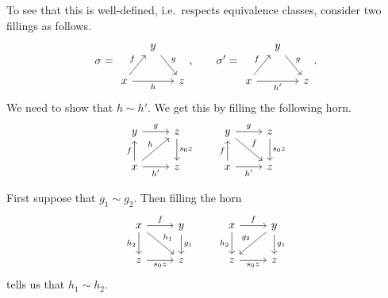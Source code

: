 \documentclass[main.tex]{subfiles}
\begin{document}
\begin{definition}
\begin{itemize}
      To see that this is well-defined, i.e.\ respects equivalence classes, consider two fillings as follows.
      \begin{equation*}
        \sigma =
        \begin{tikzcd}[column sep=small]
          & y
          \arrow[dr, "g"]
          \\
          x
          \arrow[rr, swap, "h"]
          \arrow[ur, "f"]
          && z
        \end{tikzcd}
        ,\qquad \sigma' =
        \begin{tikzcd}[column sep=small]
          & y
          \arrow[dr, "g"]
          \\
          x
          \arrow[rr, swap, "h'"]
          \arrow[ur, "f"]
          && z
        \end{tikzcd}.
      \end{equation*}
      We need to show that $h \sim h'$. We get this by filling the following horn.
      \begin{equation*}
        \begin{tikzcd}
          y
          \arrow[r, "g"]
          & z
          \arrow[d, "s_{0}z"]
          \\
          x
          \arrow[u, "f"]
          \arrow[ur, "h"]
          \arrow[r, swap, "h'"]
          & z
        \end{tikzcd}
        \qquad
        \begin{tikzcd}
          y
          \arrow[r, "g"]
          \arrow[dr, "f"]
          & z
          \arrow[d, "s_{0}z"]
          \\
          x
          \arrow[u, "f"]
          \arrow[r, swap, "h'"]
          & z
        \end{tikzcd}
      \end{equation*}

      First suppose that $g_{1} \sim g_{2}$. Then filling the horn
      \begin{equation*}
        \begin{tikzcd}
          x
          \arrow[r, "f"]
          \arrow[d, swap, "h_{2}"]
          \arrow[dr, "h_{1}"]
          & y
          \arrow[d, "g_{1}"]
          \\
          z
          \arrow[r, swap, "s_{0}z"]
          & z
        \end{tikzcd}
        \qquad
        \begin{tikzcd}
          x
          \arrow[r, "f"]
          \arrow[d, swap, "h_{2}"]
          & y
          \arrow[d, "g_{1}"]
          \arrow[dl, swap, "g_{2}"]
          \\
          z
          \arrow[r, swap, "s_{0}z"]
          & z
        \end{tikzcd}
      \end{equation*}
      tells us that $h_{1} \sim h_{2}$.


\end{itemize}
\end{definition}
\end{document}
